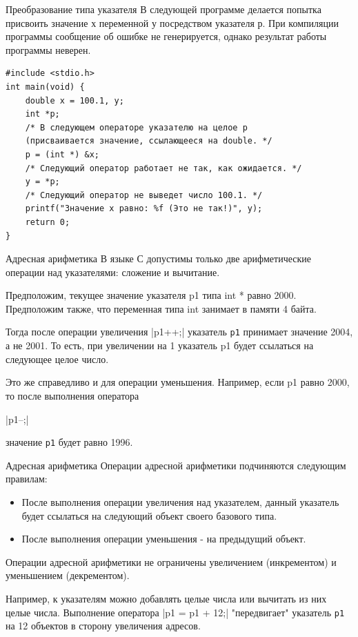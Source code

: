 \documentclass{beamer}
\begin{document}
\begin{frame}[fragile]{Преобразование типа указателя}
    В следующей программе делается попытка присвоить значение х переменной у посредством указателя р. При компиляции программы сообщение об ошибке не генерируется, однако результат работы программы неверен.
    \medskip
\begin{verbatim}
#include <stdio.h>
int main(void) {
    double x = 100.1, y;
    int *p;
    /* В следующем операторе указателю на целое p
    (присваивается значение, ссылающееся на double. */
    p = (int *) &x;
    /* Следующий оператор работает не так, как ожидается. */
    y = *p;
    /* Следующий оператор не выведет число 100.1. */
    printf("Значение x равно: %f (Это не так!)", y);
    return 0;
}
\end{verbatim}
\end{frame}

\begin{frame}{Адресная арифметика}
    В языке С допустимы только две арифметические операции над указателями: сложение и вычитание.
    
    \medskip Предположим, текущее значение указателя p1 типа int * равно 2000. Предположим также, что переменная типа int занимает в памяти 4 байта. 
    
    \medskip Тогда после операции увеличения
    |p1++;|
    указатель \texttt{p1} принимает значение 2004, а не 2001. То есть, при увеличении на 1 указатель p1 будет ссылаться на следующее целое число.
    
    \medskip Это же справедливо и для операции уменьшения. Например, если p1 равно 2000, то после выполнения оператора
    
    |p1--;|
    
    значение \texttt{p1} будет равно 1996.
\end{frame}

\begin{frame}{Адресная арифметика}
    Операции адресной арифметики подчиняются следующим правилам:
    \begin{itemize}
        \item После выполнения операции увеличения над указателем, данный указатель будет ссылаться на следующий объект своего базового типа.
        \item После выполнения операции уменьшения - на предыдущий объект.
    \end{itemize}
    
    \medskip
    Операции адресной арифметики не ограничены увеличением (инкрементом) и уменьшением (декрементом). 
    
    \medskip Например, к указателям можно добавлять целые числа или вычитать из них целые числа. Выполнение оператора
    \medskip
    |p1 = p1 + 12;|
    \medskip
    "передвигает" указатель \texttt{p1} на 12 объектов в сторону увеличения адресов.
\end{frame}
\end{document}
